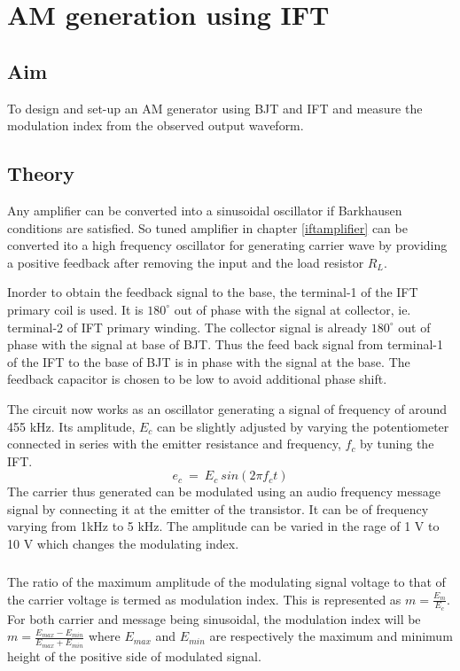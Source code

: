 \chapter[AM generation using IFT]{AM generation using IFT}

\section*{Aim}
To design and set-up  an AM generator using BJT and IFT and measure the modulation index from the observed output waveform.

\section*{Theory}
Any amplifier can be converted into a sinusoidal oscillator if Barkhausen conditions are satisfied. So tuned amplifier in chapter \ref{iftamplifier} can be converted ito a high frequency oscillator for generating carrier wave by providing a positive feedback after removing  the input and the load resistor $R_L$.

Inorder to obtain the feedback signal to the base, the terminal-1 of the IFT primary coil is used. It is $180^{\circ}$ out of phase with the signal at collector, ie. terminal-2 of IFT primary winding. The collector signal is already $180^{\circ}$ out of phase with the signal at base of BJT. Thus the feed back signal from terminal-1 of the IFT to the base of BJT is in phase with the signal at the base. The feedback capacitor is chosen to be low to avoid additional phase shift.  

The circuit now works as an oscillator generating a signal of frequency of around 455 kHz. Its amplitude, $E_c$ can be slightly adjusted by varying the potentiometer connected in series with the emitter resistance and frequency, $f_c$ by tuning the IFT.
\begin{equation}
e_c\ =\ E_c\ sin(2\pi f_ct)
\end{equation}
The carrier thus generated can be modulated using an audio frequency message signal by connecting it at the emitter of the transistor. It can be of frequency varying from 1kHz to 5 kHz. The amplitude can be varied in the rage of 1 V to 10 V which changes the modulating index.


\paragraph{}
The ratio of the maximum amplitude of the modulating signal voltage to that of the carrier voltage is termed as modulation index. This is represented as $m=\frac{E_m}{E_c}$. For both carrier and message being sinusoidal, the modulation index will be 
$m=\frac{E_{max}-E_{min}}{E_{max}+E_{min}}$
\noindent where $E_{max}$ and $E_{min}$ are respectively the maximum and minimum height of the positive side of modulated signal.
